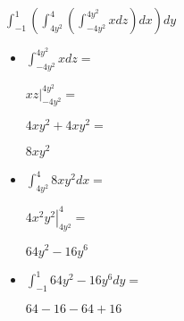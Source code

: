 \documentclass[../practica_08.tex]{subfiles}
\begin{document}
\begin{enumerate}
            $\int_{-1}^1 (\int_{4y^2}^4 (\int_{-4y^2}^{4y^2} x dz) dx) dy$

            \begin{itemize}
                \item $\int_{-4y^2}^{4y^2} x dz = $

                    $ \left. xz \right |_{-4y^2}^{4y^2} = $

                    $ 4xy^2  + 4xy^2 = $

                    $ 8xy^2 $

                \item  $\int_{4y^2}^4 8xy^2 dx = $
                
                    $ \left. 4x^2y^2 \right |_{4y^2}^4 = $

                    $ 64y^2 - 16y^6 $

                \item  $\int_{-1}^1 64y^2 - 16y^6 dy = $
                
                    $ 64 - 16 - 64 + 16 $

            \end{itemize}

    \end{enumerate}
\end{document}
